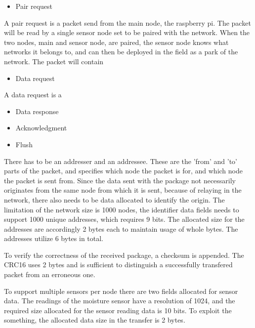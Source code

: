 \begin{itemize}
\item Pair request
\end{itemize}
A pair request is a packet send from the main node, the raspberry pi.
The packet will be read by a single sensor node set to be paired with the network.
When the two nodes, main and sensor node, are paired, the sensor node knows what networks it belongs to, and can then be deployed in the field as a park of the network. 
The packet will contain 

\begin{itemize}
\item Data request
\end{itemize}
A data request is a 

\begin{itemize}
\item Data response
\end{itemize}

\begin{itemize}
\item Acknowledgment
\end{itemize}

\begin{itemize}
\item Flush
\end{itemize}

There has to be an addresser and an addressee. These are the 'from' and 'to' parts of the packet, and specifies which node the packet is for, and which node the packet is sent from. Since the data sent with the package not necessarily originates from the same node from which it is sent, because of relaying in the network, there also needs to be data allocated to identify the origin. The limitation of the network size is 1000 nodes, the identifier data fields needs to support 1000 unique addresses, which requires 9 bits. The allocated size for the addresses are accordingly 2 bytes each to maintain usage of whole bytes. The addresses utilize 6 bytes in total.

To verify the correctness of the received package, a checksum is appended. The CRC16 uses 2 bytes and is sufficient to distinguish a successfully transfered packet from an erroneous one. 

To support multiple sensors per node there are two fields allocated for sensor data.
The readings of the moisture sensor have a resolution of 1024, and the required size allocated for the sensor reading data is 10 bits. To exploit the something, the allocated data size in the transfer is 2 bytes.

